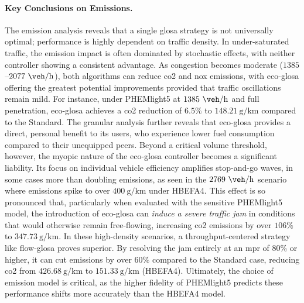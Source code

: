 \paragraph{Key Conclusions on Emissions.}
The emission analysis reveals that a single \ac{glosa} strategy is not universally optimal; performance is highly dependent on traffic density. In under-saturated traffic, the emission impact is often dominated by stochastic effects, with neither controller showing a consistent advantage. As congestion becomes moderate ($1385$--$2077~\unit{\veh\per\hour}$), both algorithms can reduce \ac{co2} and \ac{nox} emissions, with \ac{eco-glosa} offering the greatest potential improvements provided that traffic oscillations remain mild. For instance, under PHEMlight5 at $1385~\unit{\veh\per\hour}$ and full penetration, \ac{eco-glosa} achieves a \ac{co2} reduction of $6.5\%$ to $148.21~\unit{\gram\per\kilo\metre}$ compared to the Standard. The granular analysis further reveals that \ac{eco-glosa} provides a direct, personal benefit to its users, who experience lower fuel consumption compared to their unequipped peers.
\mynewline
Beyond a critical volume threshold, however, the myopic nature of the \ac{eco-glosa} controller becomes a significant liability. Its focus on individual vehicle efficiency amplifies stop-and-go waves, in some cases more than doubling emissions, as seen in the $2769~\unit{\veh\per\hour}$ scenario where emissions spike to over $400~\unit{\gram\per\kilo\metre}$ under HBEFA4. This effect is so pronounced that, particularly when evaluated with the sensitive PHEMlight5 model, the introduction of \ac{eco-glosa} can \textit{induce a severe traffic jam} in conditions that would otherwise remain free-flowing, increasing \ac{co2} emissions by over $106\%$ to $347.73~\unit{\gram\per\kilo\metre}$. In these high-density scenarios, a throughput-centered strategy like \ac{flow-glosa} proves superior. By resolving the jam entirely at an \ac{mpr} of $80\%$ or higher, it can cut emissions by over $60\%$ compared to the Standard case, reducing \ac{co2} from $426.68~\unit{\gram\per\kilo\metre}$ to $151.33~\unit{\gram\per\kilo\metre}$ (HBEFA4). Ultimately, the choice of emission model is critical, as the higher fidelity of PHEMlight5 predicts these performance shifts more accurately than the HBEFA4 model.
\mynewline
